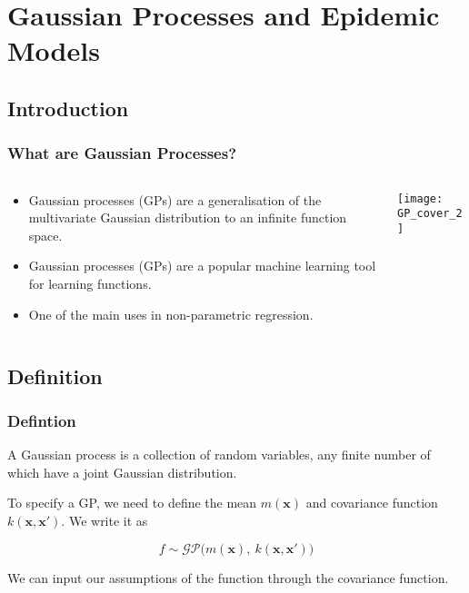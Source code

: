 \documentclass[demo]{beamer}
\begin{document}
\section{Gaussian Processes and Epidemic Models}
\subsection{Introduction}
\begin{frame}
	\frametitle{What are Gaussian Processes?}
	\begin{columns}[T] 
     \begin{column}[T]{5cm} 
     \begin{itemize}
     	\item Gaussian processes (GPs) are a generalisation of the multivariate Gaussian distribution to an infinite function space.  
     	\item Gaussian processes (GPs) are a popular machine learning tool for learning functions. 
   		\item One of the main uses in non-parametric regression. 
     \end{itemize}
     \end{column}
     \begin{column}[T]{5cm} 
     \centering
     \texttt{[image: GP\_cover\_2]}
     \end{column}
     \end{columns}
     \nocite{Ras06}
\end{frame}

\subsection{Definition}
\begin{frame}
	\frametitle{Defintion}
	\begin{definition}
		A Gaussian process is a collection of random variables, any finite number of which have a joint Gaussian distribution.
	\end{definition}
	
	To specify a GP, we need to define the mean $m(\textbf{x})$ and covariance function $k(\textbf{x}, \textbf{x}')$. We write it as 
	
	$$
	f \sim \mathcal{GP}\big(m(\textbf{x}), \> k(\textbf{x}, \textbf{x}')\big)
	$$
	
	We can input our assumptions of the function through the covariance function. 

\end{frame}
\end{document}
